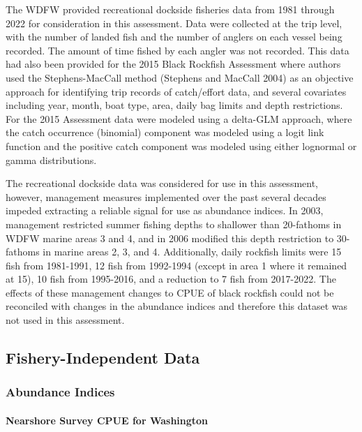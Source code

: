 \documentclass[11pt,
  english,
  letterpaper,
]{article}
\begin{document}
The WDFW provided recreational dockside fisheries data from 1981 through 2022 for consideration in this assessment. Data were collected at the trip level, with the number of landed fish and the number of anglers on each vessel being recorded. The amount of time fished by each angler was not recorded. This data had also been provided for the 2015 Black Rockfish Assessment where authors used the Stephens-MacCall method (Stephens and MacCall 2004) as an objective approach for identifying trip records of catch/effort data, and several covariates including year, month, boat type, area, daily bag limits and depth restrictions. For the 2015 Assessment data were modeled using a delta-GLM approach, where the catch occurrence (binomial) component was modeled using a logit link function and the positive catch component was modeled using either lognormal or gamma distributions.

The recreational dockside data was considered for use in this assessment, however, management measures implemented over the past several decades impeded extracting a reliable signal for use as abundance indices. In 2003, management restricted summer fishing depths to shallower than 20-fathoms in WDFW marine areas 3 and 4, and in 2006 modified this depth restriction to 30-fathoms in marine areas 2, 3, and 4. Additionally, daily rockfish limits were 15 fish from 1981-1991, 12 fish from 1992-1994 (except in area 1 where it remained at 15), 10 fish from 1995-2016, and a reduction to 7 fish from 2017-2022. The effects of these management changes to CPUE of black rockfish could not be reconciled with changes in the abundance indices and therefore this dataset was not used in this assessment.

\hypertarget{fishery-independent-data}{%
\subsection{Fishery-Independent Data}\label{fishery-independent-data}}

\hypertarget{abundance-indices-1}{%
\subsubsection{Abundance Indices}\label{abundance-indices-1}}

\hypertarget{nearshore-survey-cpue-for-washington}{%
\paragraph{Nearshore Survey CPUE for Washington}\label{nearshore-survey-cpue-for-washington}}
\end{document}
